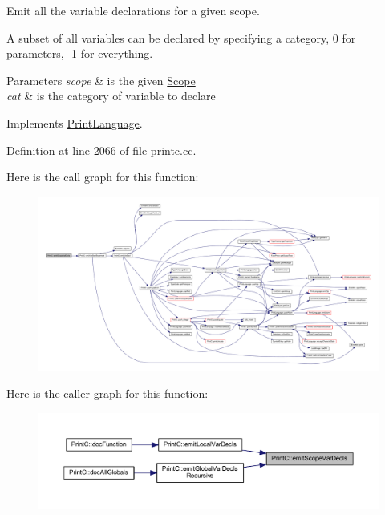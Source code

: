 Emit all the variable declarations for a given scope. 

A subset of all variables can be declared by specifying a category, 0 for parameters, -\/1 for everything. 
\begin{DoxyParams}{Parameters}
{\em scope} & is the given \mbox{\hyperlink{class_scope}{Scope}} \\
\hline
{\em cat} & is the category of variable to declare \\
\hline
\end{DoxyParams}


Implements \mbox{\hyperlink{class_print_language_a84affe778545c950190a9d7d3edbf6e5}{Print\+Language}}.



Definition at line 2066 of file printc.\+cc.

Here is the call graph for this function\+:
\nopagebreak
\begin{figure}[H]
\begin{center}
\leavevmode
\includegraphics[width=350pt]{class_print_c_af3fcfeca02664799789cf4042956ee26_cgraph}
\end{center}
\end{figure}
Here is the caller graph for this function\+:
\nopagebreak
\begin{figure}[H]
\begin{center}
\leavevmode
\includegraphics[width=350pt]{class_print_c_af3fcfeca02664799789cf4042956ee26_icgraph}
\end{center}
\end{figure}
\mbox{\label{class_print_c_a790cee3e0a91933b641ccf0433868ef1}} 

